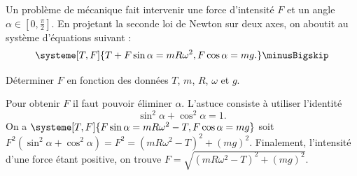 


\finEntrainement


\hauteurLargeurCadreReponse		{1cm}{4.4cm}
\initialisationEntrainement


\debutEntrainement

Un problème de mécanique fait intervenir une force d'intensité $F$ et un angle  
$\alpha\in \left [0,\frac{\pi}{2} \right]$. En projetant la seconde loi de Newton sur deux axes, on aboutit au système d'équations suivant :
	\[
	\systeme[T,F]{T+F\sin\alpha=mR\omega^2, F\cos\alpha=mg.}\minusBigskip
	\]


\begin{enonce}
Déterminer $F$ en fonction des données $T$, $m$, $R$, $\omega$ et $g$.
\end{enonce}


\begin{corrige}
	Pour obtenir $F$ il faut pouvoir éliminer $\alpha$. L'astuce consiste à utiliser l'identité
	\[\sin^2\alpha+\cos^2\alpha=1.\]
	On a $\systeme[T,F]{F\sin\alpha=mR\omega^2-T,F\cos\alpha=mg}$ soit $F^2(\sin^2\alpha+\cos^2\alpha)=F^2=\left(mR\omega^2-T\right)^2+(mg)^2$. Finalement, l'intensité d'une force étant positive, on trouve $F=\sqrt{\left(mR\omega^2-T\right)^2+(mg)^2}$.
\end{corrige}

